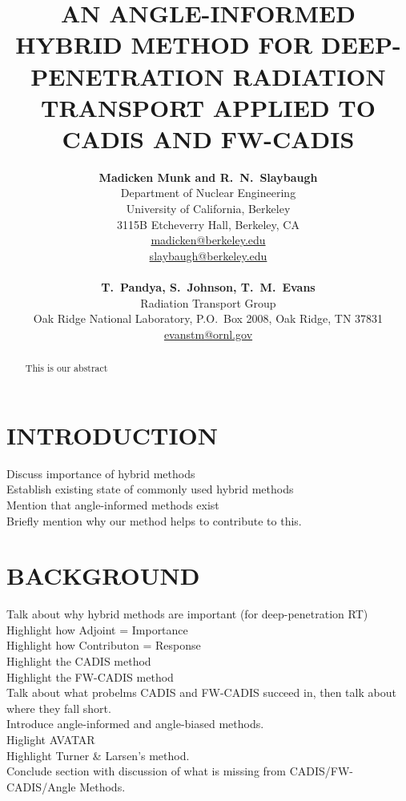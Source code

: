 \documentclass[12pt]{article}
\title{AN ANGLE-INFORMED HYBRID METHOD FOR DEEP-PENETRATION RADIATION TRANSPORT APPLIED TO CADIS AND FW-CADIS}
\author{ 
  \textbf{Madicken Munk and R.\ N.\ Slaybaugh} \\
  Department of Nuclear Engineering \\
  University of California, Berkeley \\
  3115B Etcheverry Hall, Berkeley, CA \\
  \href{mailto:madicken@berkeley.edu}{madicken@berkeley.edu}\\
  \href{mailto:slaybaugh@berkeley.edu}{slaybaugh@berkeley.edu}\\
  \\
  \textbf{T.\ Pandya, S.\ Johnson, T.\ M.\ Evans}\\
  Radiation Transport Group\\
  Oak Ridge National Laboratory, P.O.\ Box 2008, Oak Ridge, TN 37831\\
  \href{mailto:evanstm@ornl.gov}{evanstm@ornl.gov}
  }
\begin{document}


\maketitle

\begin{abstract}
This is our abstract
\end{abstract}


%
\section{INTRODUCTION}
\label{sect::intro}

Discuss importance of hybrid methods \\
Establish existing state of commonly used hybrid methods \\
Mention that angle-informed methods exist \\
Briefly mention why our method helps to contribute to this. \\


%
\section{BACKGROUND}
\label{sect::second}

Talk about why hybrid methods are important (for deep-penetration RT) \\
Highlight how Adjoint = Importance \\
Highlight how Contributon = Response \\
Highlight the CADIS method \\
Highlight the FW-CADIS method \\
Talk about what probelms CADIS and FW-CADIS succeed in, then talk about where they fall short. \\
Introduce angle-informed and angle-biased methods. \\
Higlight AVATAR \\
Highlight Turner \& Larsen's method. \\
Conclude section with discussion of what is missing from CADIS/FW-CADIS/Angle Methods. \\
\end{document}
